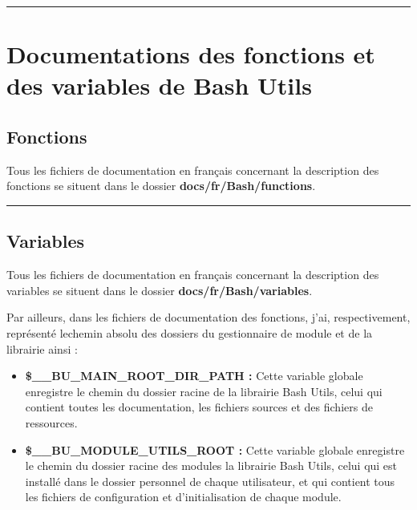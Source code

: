 \documentclass[a4paper,10pt]{article}
\begin{document}
\color{red}\par\noindent\rule{\textwidth}{0.4pt}\color{white}

\color{red}
\section{Documentations des fonctions et des variables de Bash Utils}\color{white}

\color{green}
\subsection{Fonctions}\color{white}

\begin{justify}
    Tous les fichiers de documentation en français concernant la description des fonctions se situent dans le dossier \textbf{\color{lime}docs/fr/Bash/functions}.
\end{justify}




\color{green}\par\noindent\rule{\textwidth}{0.4pt}\color{white}

\color{green}
\subsection{Variables}\color{white}

\begin{justify}
    Tous les fichiers de documentation en français concernant la description des variables se situent dans le dossier \textbf{\color{lime}docs/fr/Bash/variables}.
\end{justify}


\begin{justify}
    Par ailleurs, dans les fichiers de documentation des fonctions, j'ai, respectivement, représenté le\linebreak chemin absolu des dossiers du gestionnaire de module et de la librairie ainsi :

    \begin{itemize}
        \item \textbf{\color{orange}\$\_\_BU\_MAIN\_ROOT\_DIR\_PATH\color{white} :} Cette variable globale enregistre le chemin du dossier racine de la librairie Bash Utils, celui qui contient toutes les documentation, les fichiers sources et des fichiers de ressources.\\

        \item \textbf{\color{orange}\$\_\_BU\_MODULE\_UTILS\_ROOT\color{white} :} Cette variable globale enregistre le chemin du dossier racine des modules la librairie Bash Utils, celui qui est installé dans le dossier personnel de chaque utilisateur, et qui contient tous les fichiers de configuration et d'initialisation de chaque module.
    \end{itemize}
\end{justify}
\end{document}
